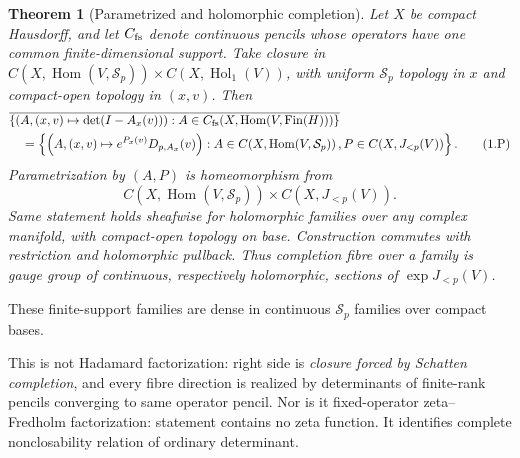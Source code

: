 \documentclass[11pt]{article}
\newtheorem{theorem}{Theorem}[section]
\theoremstyle{definition}
\theoremstyle{remark}
\begin{document}
\begin{theorem}[Parametrized and holomorphic completion]
\label{thm:parametrized-completion}
Let $X$ be compact Hausdorff, and let $C_{\rm fs}$ denote continuous pencils whose operators
have one common finite-dimensional support.  Take closure in
$C(X,\operatorname{Hom}(V,\mathcal S_p))\times C(X,\operatorname{Hol}_1(V))$, with uniform
$\mathcal S_p$ topology in $x$ and compact-open topology in $(x,v)$.  Then
\begin{align}
&\overline{\left\{\left(A,(x,v)\mapsto\det(I-A_x(v))\right):
 A\in C_{\rm fs}\!\left(X,\operatorname{Hom}(V,\operatorname{Fin}(H))\right)\right\}} \notag\\
&\quad=\left\{\left(A,(x,v)\mapsto e^{P_x(v)}D_{p,A_x}(v)\right):
 A\in C\!\left(X,\operatorname{Hom}(V,\mathcal S_p)\right),
 P\in C\!\left(X,J_{<p}(V)\right)\right\}.                 \tag{1.P}
\end{align}
Parametrization by $(A,P)$ is homeomorphism from
\begin{equation*}
 C\!\left(X,\operatorname{Hom}(V,\mathcal S_p)\right)
 \times C\!\left(X,J_{<p}(V)\right).
\end{equation*}
Same statement holds sheafwise for holomorphic
families over any complex manifold, with compact-open topology on base.  Construction commutes
with restriction and holomorphic pullback.  Thus completion fibre over a family is gauge group
of continuous, respectively holomorphic, sections of $\exp J_{<p}(V)$.
\end{theorem}

These finite-support families are dense in continuous $\mathcal S_p$ families over compact
bases.

This is not Hadamard factorization: right side is \emph{closure forced by Schatten completion},
and every fibre direction is realized by determinants of finite-rank pencils converging to same
operator pencil.  Nor is it fixed-operator zeta--Fredholm factorization: statement contains no
zeta function.  It identifies complete nonclosability relation of ordinary determinant.
\end{document}
